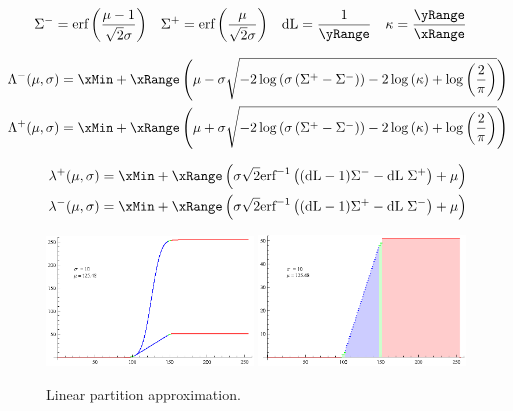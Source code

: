 \begin{equation}
\begin{aligned}
\Sigma^- &= \text{erf}\left(\frac{\mu -1}{\sqrt{2} \sigma }\right) &
 \Sigma^+ &= \text{erf}\left(\frac{\mu }{\sqrt{2} \sigma }\right) &
  \text{dL} &= \frac{1}{\yRange} &
  \kappa &= \frac{\yRange}{\xRange} 
\end{aligned}
\end{equation}

\begin{equation}\label{eq:PreservedRegionGen}
\begin{aligned}
\Lambda^-(\mu,\sigma) &= \xMin + \xRange\left( \mu - \sigma  \sqrt{-2 \log \left(\sigma  \left(\Sigma^+-\Sigma^-\right)\right) - 2 \log \left(\kappa\right)+\log \left(\frac{2}{\pi }\right)}\right) \\
\Lambda^+(\mu,\sigma) &= \xMin + \xRange \left(\mu + \sigma  \sqrt{-2 \log \left(\sigma  \left(\Sigma^+-\Sigma^-\right)\right)-2 \log \left(\kappa\right)+\log \left(\frac{2}{\pi }\right)}\right)
\end{aligned}
\end{equation}

\begin{equation}\label{eq:LowHighGen}
\begin{aligned}
\lambda^+(\mu,\sigma)  &=  \xMin + \xRange \left( \sigma \sqrt{2}  \text{erf}^{-1}\left((\text{dL}-1) \Sigma^- -\text{dL} \; \Sigma^+ \right)+\mu \right) \\
\lambda^-(\mu,\sigma)  &=  \xMin + \xRange \left( \sigma \sqrt{2} \text{erf}^{-1}\left((\text{dL}-1) \Sigma^+-\text{dL} \; \Sigma^-\right)+\mu \right)
\end{aligned}
\end{equation}



\begin{figure}[h!]
  \centering
    \includegraphics[width=0.49\textwidth]{Chapter2/Figs/partitionSmooth2.eps}
    \includegraphics[width=0.49\textwidth]{Chapter2/Figs/partitionColor2.eps}
    \caption{Linear partition approximation.}  \label{fig:Partition}
\end{figure}

